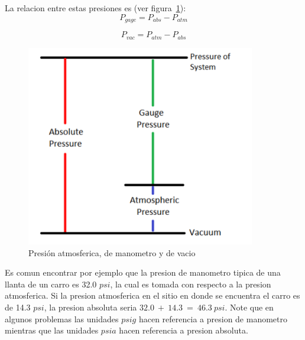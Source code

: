 \documentclass[10pt, oneside]{article}
\begin{document}
La relacion entre estas presiones es (ver figura~\ref{pres1}):
\begin{equation}
P_{gage} = P_{abs}-P_{atm}
\end{equation}

\begin{equation}
P_{vac} = P_{atm}-P_{abs}
\end{equation}

\begin{figure}[h]
\centering
\includegraphics[width=10cm]{pres1}
\caption{Presi\'on atmosferica, de manometro y de vacio}
\label{pres1}
\end{figure}

Es comun encontrar por ejemplo que la presion de manometro tipica de una llanta de un carro es 32.0 $psi$, la cual es tomada con respecto a la presion atmosferica. Si la presion atmosferica en el sitio en donde se encuentra el carro es de 14.3 $psi$, la presion absoluta seria $32.0\ +\ 14.3\ =\ 46.3\ psi$. Note que en algunos problemas las unidades $psig$ hacen referencia a presion de manometro mientras que las unidades $psia$ hacen referencia a presion absoluta. 
\end{document}

